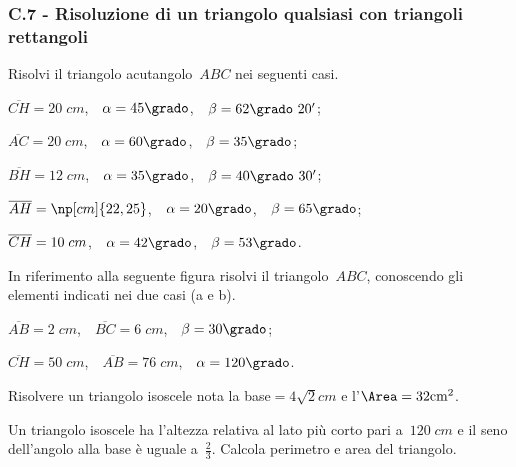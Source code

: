 \subsubsection*{C.7 - Risoluzione di un triangolo qualsiasi con triangoli rettangoli}

\begin{esercizio}
\label{ese:C.22}
Risolvi il triangolo acutangolo~$ABC$ nei seguenti casi.
\begin{multicols}{2}
\begin{enumeratea}
\item $\overline{CH}=20\;\unit{cm}$,~~$\alpha=45\grado$,~~$\beta=62\grado~20'$;
\item $\overline{AC}=20\;\unit{cm}$,~~$\alpha=60\grado$,~~$\beta=35\grado$;
\item $\overline{BH}=12\;\unit{cm}$,~~$\alpha=35\grado$,~~$\beta=40\grado~30'$;
\item $\overline{AH}=\np[cm]{22,25}$,~~$\alpha=20\grado$,~~$\beta=65\grado$;
\item $\overline{CH}=10\unit\;{cm}$,~~$\alpha=42\grado$,~~$\beta=53\grado$.
\end{enumeratea}
\end{multicols}
\end{esercizio}

\begin{esercizio}
\label{ese:C.23}
In riferimento alla seguente figura risolvi il triangolo~$ABC$, conoscendo gli elementi indicati nei due casi (a e b).
\begin{center}
  
\end{center}
\begin{multicols}{2}
 \begin{enumeratea}
\item $\overline{AB}=2\;\unit{cm}$,~~$\overline{BC}=6\;\unit{cm}$,~~$\beta=30\grado$;
\item $\overline{CH}=50\;\unit{cm}$,~~$\overline{AB}=76\;\unit{cm}$,~~$\alpha=120\grado$.
\end{enumeratea}
\end{multicols}
\end{esercizio}

\begin{multicols}{2}
\begin{esercizio}
\label{ese:C.24}
Risolvere un triangolo isoscele nota la base$=4\sqrt{2}\unit{cm}$ e l'$\Area=32\unit{cm^2}$.
\end{esercizio}

\begin{esercizio}
\label{ese:C.25}
Un triangolo isoscele ha l'altezza relativa al lato più corto pari a~$120\;\unit{cm}$ e il seno dell'angolo alla base è uguale a~$\frac{2}{3}$.
Calcola perimetro e area del triangolo.
\end{esercizio}
\end{multicols}

